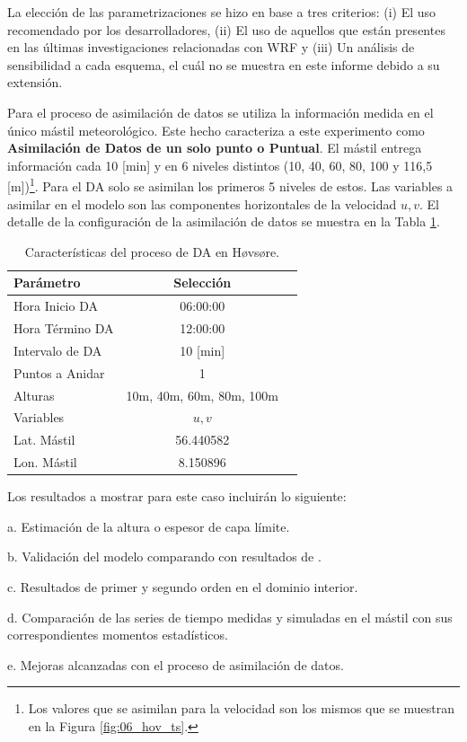 
La elección de las parametrizaciones se hizo en base a tres criterios: (i) El uso recomendado por los desarrolladores, (ii) El uso de aquellos que están presentes en las últimas investigaciones relacionadas con WRF y (iii) Un análisis de sensibilidad a cada esquema, el cuál no se muestra en este informe debido a su extensión.

Para el proceso de asimilación de datos se utiliza la información medida en el único mástil meteorológico. Este hecho caracteriza a este experimento como \textbf{Asimilación de Datos de un solo punto o Puntual}. El mástil entrega información cada 10 [min] y en 6 niveles distintos (10, 40, 60, 80, 100 y 116,5 [m])\footnote{Los valores que se asimilan para la velocidad son los mismos que se muestran en la Figura \ref{fig:06_hov_ts}.}. Para el DA solo se asimilan los primeros 5 niveles de estos. Las variables a asimilar en el modelo son las componentes horizontales de la velocidad $u,v$. El detalle de la configuración de la asimilación de datos se muestra en la Tabla \ref{tab:05_config_da_hov}.

\begin{table}[h!]
	\caption{Características del proceso de DA en Høvsøre.}\label{tab:05_config_da_hov}
	\centering\footnotesize
	\begin{tabular}{lcc}
		\toprule
		Parámetro & Selección \\
		\midrule
		Hora Inicio	DA 	 & 06:00:00   \\
		Hora Término DA	 		 & 12:00:00  \\
		Intervalo de DA	&	10 [min] \\
		Puntos a Anidar	 	 & 1   \\
		Alturas 	& 10m, 40m, 60m, 80m, 100m \\
		Variables	& $u,v$   \\
		Lat. Mástil	& 56.440582   \\
		Lon. Mástil	& 8.150896   \\
		
		\bottomrule
	\end{tabular}
\end{table}
\newpage
Los resultados a mostrar para este caso incluirán lo siguiente:
\begin{enumerate*}
	\item [a.]Estimación de la altura o espesor de capa límite.
	\item [b.]Validación del modelo comparando con resultados de \cite{Pea2013}.
	\item [c.]Resultados de primer y segundo orden en el dominio interior.
	\item [d.]Comparación de las series de tiempo medidas y simuladas en el mástil con sus correspondientes momentos estadísticos.
	\item [e.]Mejoras alcanzadas con el proceso de asimilación de datos.
\end{enumerate*}

